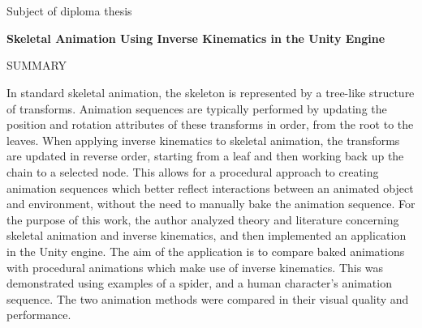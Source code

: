 \documentclass[oneside,12pt]{wipb}
\begin{document}
\maketitle
\thispagestyle{empty}
\chapter*{}


\noindent Subject of diploma thesis

\noindent\textbf{Skeletal Animation Using Inverse Kinematics in the Unity Engine}

\begin{center}
    SUMMARY
\end{center}

In standard skeletal animation, the skeleton is represented by a tree-like
structure of transforms. Animation sequences are typically performed by updating
the position and rotation attributes of these transforms in order, from the root
to the leaves. When applying inverse kinematics to skeletal animation, the
transforms are updated in reverse order, starting from a leaf and then working
back up the chain to a selected node. This allows for a procedural approach to
creating animation sequences which better reflect interactions between an
animated object and environment, without the need to manually bake the animation
sequence. For the purpose of this work, the author analyzed theory and
literature concerning skeletal animation and inverse kinematics, and then
implemented an application in the Unity engine. The aim of the application is to
compare baked animations with procedural animations which make use of inverse
kinematics. This was demonstrated using examples of a spider, and a human
character's animation sequence. The two animation methods were compared in their
visual quality and performance.
\thispagestyle{empty}
\end{document}
